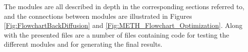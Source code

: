 \documentclass[../../CompleteThesis2/Complete_2ndDraft]{subfiles}
\begin{document}
The modules are all described in depth in the corresponding sections referred to, and the connections between modules are illustrated in Figures \ref{Fig:FlowchartBackDiffusion} and \ref{Fig:METH_Flowchart_Optimization}. Along with the presented files are a number of files containing code for testing the different modules and for generating the final results.
%	
%	
%	
%	
\end{document}
